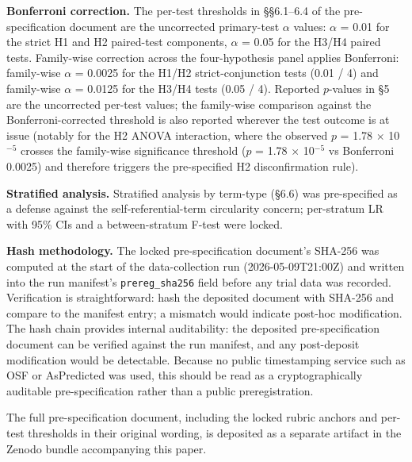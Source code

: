\documentclass[11pt,a4paper]{article}
\begin{document}
\textbf{Bonferroni correction.} The per-test thresholds in \S\S6.1--6.4 of the pre-specification document are the uncorrected primary-test $\alpha$ values: $\alpha$ = 0.01 for the strict H1 and H2 paired-test components, $\alpha$ = 0.05 for the H3/H4 paired tests. Family-wise correction across the four-hypothesis panel applies Bonferroni: family-wise $\alpha$ = 0.0025 for the H1/H2 strict-conjunction tests (0.01 / 4) and family-wise $\alpha$ = 0.0125 for the H3/H4 tests (0.05 / 4). Reported $p$-values in \S5 are the uncorrected per-test values; the family-wise comparison against the Bonferroni-corrected threshold is also reported wherever the test outcome is at issue (notably for the H2 ANOVA interaction, where the observed $p$ = 1.78 $\times$ 10$^{-5}$ crosses the family-wise significance threshold ($p$ = 1.78 $\times$ 10$^{-5}$ vs Bonferroni 0.0025) and therefore triggers the pre-specified H2 disconfirmation rule).

\textbf{Stratified analysis.} Stratified analysis by term-type (\S6.6) was pre-specified as a defense against the self-referential-term circularity concern; per-stratum LR with 95\% CIs and a between-stratum F-test were locked.

\textbf{Hash methodology.} The locked pre-specification document's SHA-256 was computed at the start of the data-collection run (2026-05-09T21:00Z) and written into the run manifest's \texttt{prereg\_sha256} field before any trial data was recorded. Verification is straightforward: hash the deposited document with SHA-256 and compare to the manifest entry; a mismatch would indicate post-hoc modification. The hash chain provides internal auditability: the deposited pre-specification document can be verified against the run manifest, and any post-deposit modification would be detectable. Because no public timestamping service such as OSF or AsPredicted was used, this should be read as a cryptographically auditable pre-specification rather than a public preregistration.

The full pre-specification document, including the locked rubric anchors and per-test thresholds in their original wording, is deposited as a separate artifact in the Zenodo bundle accompanying this paper.
\end{document}

